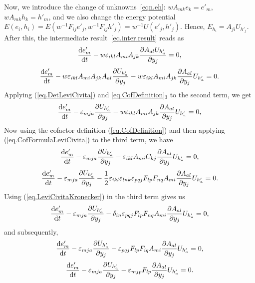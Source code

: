 \documentclass[twoside]{article}
\newcommand{\ted}{E} %
\newcommand{\pd}{\partial}
\newcommand{\rmd}{{\rm d}}
\begin{document}
Now, we introduce the change of unknowns~\eqref{eqn.eh}: $w 
A_{{mk}}e_k=e'_m$, $w A_{{mk}}h_k=h'_m$, and we also change the energy 
potential $\ted(e_i,h_i)= 
\ted(w^{-1}F_{{ij}}e'_j,w^{-1}F_{{ij}}h'_j)=w^{-1}U(e'_j,h'_j)$. Hence, 
$ \ted_{h_i} = A_{ji}U_{h'_j}$. After this, the intermediate 
result~\eqref{eq.inter.result} reads as
\begin{equation}
\frac{\rmd e'_m}{{\rmd t}}-w \varepsilon 
_{{ikl}}A_{{mi}}A_{{jk}}\frac{\pd   A_{{al}} U_{h'_a}}{\pd  y_j}=0,
\end{equation}
\begin{equation}
\frac{\rmd e'_m}{{\rmd t}}-w \varepsilon 
_{{ikl}}A_{{mi}}A_{{jk}}A_{{al}}\frac{\pd   U_{h'_a}}{\pd  y_j}-w 
\varepsilon
_{{ikl}}A_{{mi}}A_{{jk}}\frac{\pd  A_{{al}}}{\pd  y_j}   U_{h'_a}=0.
\end{equation}
Applying (\ref{eq.DetLeviCivita}) and \eqref{eq.CofDefinition}$_3 $ to the 
second term, we get
\begin{equation}
\frac{\rmd e'_m}{{\rmd t}} - \varepsilon _{{mja}}\frac{\pd   
U_{h'_a}}{\pd  y_j}-w \varepsilon _{{ikl}}A_{{mi}}A_{{jk}}\frac{\pd
A_{{al}}}{\pd  y_j}   U_{h'_a}=0,
\end{equation}
Now using the cofactor definition (\ref{eq.CofDefinition}) and then applying 
(\ref{eq.CofFormulaLeviCivita}) to the third term, we have
\begin{equation}
\frac{\rmd e'_m}{{\rmd t}} - \varepsilon _{{mja}}\frac{\pd   
U_{h'_a}}{\pd  y_j}-\varepsilon _{{ikl}}A_{{mi}}C_{{kj}}\frac{\pd
A_{{al}}}{\pd  y_j}   U_{h'_a}=0,
\end{equation}
\begin{equation}
\frac{\rmd e'_m}{{\rmd t}} - \varepsilon _{{mja}}\frac{\pd   
U_{h'_a}}{\pd  y_j}-\frac{1}{2}\varepsilon _{{ikl}}\varepsilon 
_{{lnk}}\varepsilon _{{pqj}}F_{{lp}} F_{{nq}}A_{{mi}}\frac{\pd 
A_{{al}}}{\pd  y_j}   U_{h'_a}=0.
\end{equation}
Using (\ref{eq.LeviCivitaKronecker}) in the third term gives us
\begin{equation}
\frac{\rmd e'_m}{{\rmd t}} - \varepsilon _{{mja}}\frac{\pd   
U_{h'_a}}{\pd  y_j}-\delta _{{in}}\varepsilon _{{pqj}}F_{{lp}} 
F_{{nq}}A_{{mi}}\frac{\pd A_{{al}}}{\pd  y_j}   U_{h'_a}=0,
\end{equation}
and subsequently,
\begin{equation}
\frac{\rmd e'_m}{{\rmd t}} - \varepsilon _{{mja}}\frac{\pd   
U_{h'_a}}{\pd  y_j}-\varepsilon _{{pqj}}F_{{lp}} 
F_{{iq}}A_{{mi}}\frac{\pd A_{{al}}}{\pd  y_j}   U_{h'_a}=0,
\end{equation}
\begin{equation}
\frac{\rmd e'_m}{{\rmd t}} - \varepsilon _{{mja}}\frac{\pd   
U_{h'_a}}{\pd  y_j}-\varepsilon _{{mjp}}F_{{lp}}\frac{\pd 
A_{{al}}}{\pd  y_j}   U_{h'_a}=0.
\end{equation}
\end{document}
